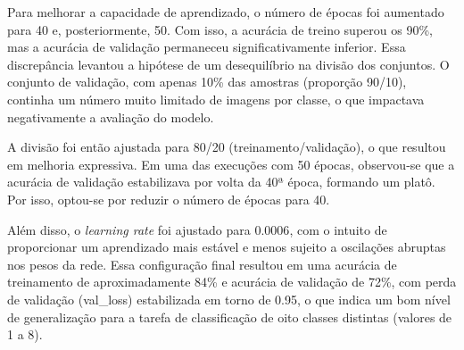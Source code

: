 Para melhorar a capacidade de aprendizado, o número de épocas foi aumentado para 40 e, posteriormente, 
50. Com isso, a acurácia de treino superou os 90\%, mas a acurácia de validação permaneceu 
significativamente inferior. Essa discrepância levantou a hipótese de um desequilíbrio na divisão dos 
conjuntos. O conjunto de validação, com apenas 10\% das amostras (proporção 90/10), continha um número 
muito limitado de imagens por classe, o que impactava negativamente a avaliação do modelo.

A divisão foi então ajustada para 80/20 (treinamento/validação), o que resultou em melhoria 
expressiva. Em uma das execuções com 50 épocas, observou-se que a acurácia de validação estabilizava 
por volta da 40ª época, formando um platô. Por isso, optou-se por reduzir o número de épocas para 40.

Além disso, o \textit{learning rate} foi ajustado para $0.0006$, com o intuito de proporcionar um 
aprendizado mais estável e menos sujeito a oscilações abruptas nos pesos da rede. Essa configuração 
final resultou em uma acurácia de treinamento de aproximadamente 84\% e acurácia de validação de 72\%, 
com perda de validação (val\_loss) estabilizada em torno de 0.95, o que indica um bom nível de generalização 
para a tarefa de classificação de oito classes distintas (valores de 1 a 8).

